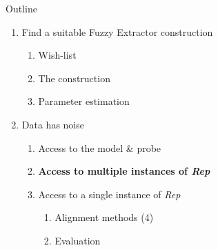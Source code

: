 \documentclass{beamer}
\def\fe{Fuzzy Extractor\xspace}
\newcommand{\rep}{\textit{Rep}\xspace}
\begin{document}
\begin{frame}{Outline}
   \begin{enumerate}
   \item Find a suitable \fe construction
\begin{enumerate}
    \item Wish-list
    \item The construction
    \item Parameter estimation\\
\end{enumerate}
   \item Data has noise
   \begin{enumerate}
       \item Access to the model \& probe
       \item \textbf{Access to multiple instances of \rep}
       \item Access to a single instance of \rep
        \begin{enumerate}
            \item Alignment methods (4)
            \item Evaluation
        \end{enumerate}
   \end{enumerate}    
\end{enumerate} 
\end{frame}
\end{document}
